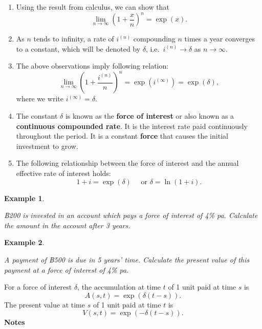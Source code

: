\documentclass[
]{book}
\theoremstyle{definition}
\theoremstyle{definition}
\newtheorem{example}{Example}[chapter]
\theoremstyle{definition}
\theoremstyle{definition}
\theoremstyle{remark}
\begin{document}
\begin{enumerate}
\def\labelenumi{\arabic{enumi}.}
\item
  Using the result from calculus, we can show that
  \[\lim_{n \rightarrow \infty} \left(1 + \frac{x}{n} \right)^n = \exp(x).\]
\item
  As \(n\) tends to infinity, a rate of \(i^{(n)}\) compounding \(n\) times
  a year converges to a constant, which will be denoted by \(\delta\),
  i.e.~\(i^{(n)} \rightarrow \delta\) as \(n \rightarrow \infty\).
\item
  The above observations imply following relation:
  \[\lim_{n \rightarrow \infty} \left(1 + \frac{i^{(n)}}{n} \right)^n  = \exp(i^{(\infty)}) = \exp(\delta),\]
  where we write \(i^{(\infty)} = \delta\).
\item
  The constant \(\delta\) is known as the \textbf{force of interest} or also
  known as a \textbf{continuous compounded rate}. It is the interest rate
  paid continuously throughout the period. It is a constant \textbf{force}
  that causes the initial investment to grow.
\item
  The following relationship between the force of interest and the
  annual effective rate of interest holds:
  \[1 + i = \exp(\delta) \quad \text { or } \delta = \ln(1+i).\]
\end{enumerate}

\begin{example}
\protect\hypertarget{exm:unlabeled-div-66}{}\label{exm:unlabeled-div-66}

\emph{฿200 is invested in an account which pays a force of interest of 4\% pa.
Calculate the amount in the account after 3 years.}

\end{example}

\begin{example}
\protect\hypertarget{exm:unlabeled-div-67}{}\label{exm:unlabeled-div-67}

\emph{A payment of ฿500 is due in 5 years' time. Calculate the present value
of this payment at a force of interest of 4\% pa.}

\end{example}

For a force of interest \(\delta\), the accumulation at time \(t\) of 1 unit
paid at time \(s\) is \[A(s,t) = \exp( \delta (t-s)).\] The present value
at time \(s\) of 1 unit paid at time \(t\) is
\[V(s,t) = \exp( -\delta (t-s)).\] \textbf{Notes}
\end{document}
